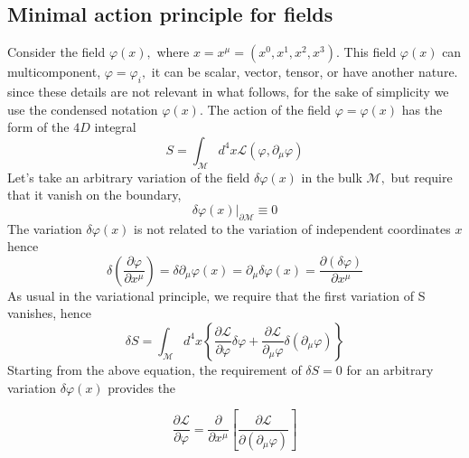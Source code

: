 \subsection{Minimal action principle for fields}
Consider the field $\varphi(x),$ where $x=x^{\mu}=\left(x^{0}, x^{1}, x^{2}, x^{3}\right) .$ This field $\varphi(x)$ can multicomponent, $\varphi=\varphi_{i},$ it can be scalar, vector, tensor, or have another nature. since these details are not relevant in what follows, for the sake of simplicity we use the condensed notation $\varphi(x)$. The action of the field $\varphi=\varphi(x)$ has the form of the $4 D$ integral 
\begin{equation}
S=\int_{\mathcal{M}} d^{4} x \mathcal{L}\left(\varphi, \partial_{\mu} \varphi\right)
\end{equation}
Let's take an arbitrary variation of the field $\delta \varphi(x)$ in the bulk $\mathcal{M},$ but require that it vanish on the boundary,
\begin{equation}
\left.\delta \varphi(x)\right|_{\partial \mathcal{M}} \equiv 0
\label{field-boundary}
\end{equation}
The variation $\delta \varphi(x)$ is not related to the variation of independent coordinates $x$ hence
\begin{equation}
\delta\left(\frac{\partial \varphi}{\partial x^{\mu}}\right)=\delta \partial_{\mu} \varphi(x)=\partial_{\mu} \delta \varphi(x)=\frac{\partial(\delta \varphi)}{\partial x^{\mu}}
\end{equation}
As usual in the variational principle, we require that the first variation of S vanishes, hence
\begin{equation}
\delta S=\int_{\mathcal{M}} d^{4} x\left\{\frac{\partial \mathcal{L}}{\partial \varphi} \delta \varphi+\frac{\partial \mathcal{L}}{\partial_{\mu} \varphi} \delta\left(\partial_{\mu} \varphi\right)\right\}
\end{equation}
Starting from the above equation, the requirement of $\delta S=0$ for an arbitrary variation $\delta \varphi(x)$ provides the 
\begin{qt}
    \begin{equation}
\frac{\partial \mathcal{L}}{\partial \varphi}=\frac{\partial}{\partial x^{\mu}}\left[\frac{\partial \mathcal{L}}{\partial\left(\partial_{\mu} \varphi\right)}\right]
\end{equation}
\end{qt}
